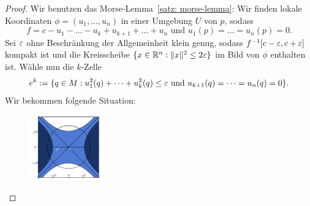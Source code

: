 \begin{proof}
    Wir benutzen das Morse-Lemma~\ref{satz: morse-lemma}:
    Wir finden lokale Koordinaten $\phi = (u_1, \dots, u_n)$ in einer Umgebung $U$ von $p$, sodass 
    \[ f = c - u_1 - \dots - u_k + u_{k + 1} + \dots + u_n
     \text{ und } u_1 (p) = \dots = u_n(p) = 0 . \]
    Sei $\varepsilon$ ohne Beschränkung der Allgemeinheit klein genug, sodass $f^{-1}[c - \varepsilon, c + \varepsilon]$ 
    kompakt ist und die Kreisscheibe $\{ x \in { \mathbb R }^n : \| x \|^2 \leq 2 \varepsilon \}$ im Bild von $\phi$ 
    enthalten ist. Wähle nun die $k$-Zelle 
    \[ e^k := \{ q \in M : u_1^2 (q) + \dots + u_k^2 (q) \leq \varepsilon \text{ und }
        u_{k + 1} (q) = \dots = u_n (q) = 0 \} . \]
    Wir bekommen folgende Situation:
    
                


            
            

    \begin{figure}[H]
        \centering
        \includegraphics[width=0.3\textwidth]{../resources/subniveaumengen-parametrisiert2.png}
    \end{figure}


\end{proof}
